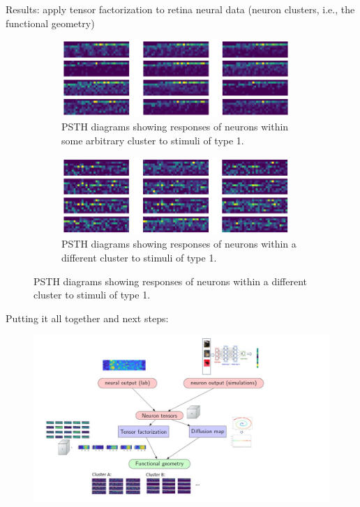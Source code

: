 \documentclass[xcolor={dvipsnames,svgnames}]{beamer}
\begin{document}
\begin{frame}{Results: apply tensor factorization to retina neural data (neuron clusters, i.e., the functional geometry)}
      \begin{figure}[H]
            \centering
            \begin{subfigure}[b]{\textwidth}
                \includegraphics[width=0.95\textwidth]{figures-retina-results/cluster20.png}
                \caption{PSTH diagrams showing responses of neurons within some arbitrary cluster to stimuli of type 1.}
            \end{subfigure}
            \vfill 
            \begin{subfigure}[b]{\textwidth}
                \includegraphics[width=0.95\textwidth]{figures-retina-results/cluster10.png}
                \caption{PSTH diagrams showing responses of neurons within a different cluster to stimuli of type 1.}
            \end{subfigure}
            \end{figure} 
\end{frame}
\begin{frame}{Putting it all together and next steps:}
\begin{figure}[H]
        \centering
            \includegraphics[width=1.2\textwidth]{Slide4.jpg}
        \end{figure} 
\end{frame}
\end{document}
